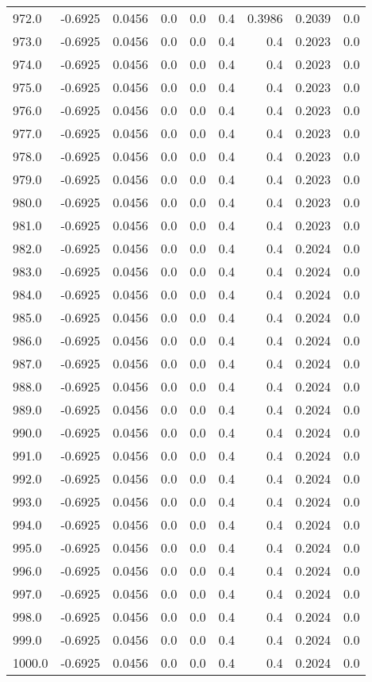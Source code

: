 \begin{longtable}{lrrrrrrrr}
972.0 & -0.6925 & 0.0456 & 0.0 & 0.0 & 0.4 & 0.3986 & 0.2039 & 0.0 \\
973.0 & -0.6925 & 0.0456 & 0.0 & 0.0 & 0.4 & 0.4 & 0.2023 & 0.0 \\
974.0 & -0.6925 & 0.0456 & 0.0 & 0.0 & 0.4 & 0.4 & 0.2023 & 0.0 \\
975.0 & -0.6925 & 0.0456 & 0.0 & 0.0 & 0.4 & 0.4 & 0.2023 & 0.0 \\
976.0 & -0.6925 & 0.0456 & 0.0 & 0.0 & 0.4 & 0.4 & 0.2023 & 0.0 \\
977.0 & -0.6925 & 0.0456 & 0.0 & 0.0 & 0.4 & 0.4 & 0.2023 & 0.0 \\
978.0 & -0.6925 & 0.0456 & 0.0 & 0.0 & 0.4 & 0.4 & 0.2023 & 0.0 \\
979.0 & -0.6925 & 0.0456 & 0.0 & 0.0 & 0.4 & 0.4 & 0.2023 & 0.0 \\
980.0 & -0.6925 & 0.0456 & 0.0 & 0.0 & 0.4 & 0.4 & 0.2023 & 0.0 \\
981.0 & -0.6925 & 0.0456 & 0.0 & 0.0 & 0.4 & 0.4 & 0.2023 & 0.0 \\
982.0 & -0.6925 & 0.0456 & 0.0 & 0.0 & 0.4 & 0.4 & 0.2024 & 0.0 \\
983.0 & -0.6925 & 0.0456 & 0.0 & 0.0 & 0.4 & 0.4 & 0.2024 & 0.0 \\
984.0 & -0.6925 & 0.0456 & 0.0 & 0.0 & 0.4 & 0.4 & 0.2024 & 0.0 \\
985.0 & -0.6925 & 0.0456 & 0.0 & 0.0 & 0.4 & 0.4 & 0.2024 & 0.0 \\
986.0 & -0.6925 & 0.0456 & 0.0 & 0.0 & 0.4 & 0.4 & 0.2024 & 0.0 \\
987.0 & -0.6925 & 0.0456 & 0.0 & 0.0 & 0.4 & 0.4 & 0.2024 & 0.0 \\
988.0 & -0.6925 & 0.0456 & 0.0 & 0.0 & 0.4 & 0.4 & 0.2024 & 0.0 \\
989.0 & -0.6925 & 0.0456 & 0.0 & 0.0 & 0.4 & 0.4 & 0.2024 & 0.0 \\
990.0 & -0.6925 & 0.0456 & 0.0 & 0.0 & 0.4 & 0.4 & 0.2024 & 0.0 \\
991.0 & -0.6925 & 0.0456 & 0.0 & 0.0 & 0.4 & 0.4 & 0.2024 & 0.0 \\
992.0 & -0.6925 & 0.0456 & 0.0 & 0.0 & 0.4 & 0.4 & 0.2024 & 0.0 \\
993.0 & -0.6925 & 0.0456 & 0.0 & 0.0 & 0.4 & 0.4 & 0.2024 & 0.0 \\
994.0 & -0.6925 & 0.0456 & 0.0 & 0.0 & 0.4 & 0.4 & 0.2024 & 0.0 \\
995.0 & -0.6925 & 0.0456 & 0.0 & 0.0 & 0.4 & 0.4 & 0.2024 & 0.0 \\
996.0 & -0.6925 & 0.0456 & 0.0 & 0.0 & 0.4 & 0.4 & 0.2024 & 0.0 \\
997.0 & -0.6925 & 0.0456 & 0.0 & 0.0 & 0.4 & 0.4 & 0.2024 & 0.0 \\
998.0 & -0.6925 & 0.0456 & 0.0 & 0.0 & 0.4 & 0.4 & 0.2024 & 0.0 \\
999.0 & -0.6925 & 0.0456 & 0.0 & 0.0 & 0.4 & 0.4 & 0.2024 & 0.0 \\
1000.0 & -0.6925 & 0.0456 & 0.0 & 0.0 & 0.4 & 0.4 & 0.2024 & 0.0 \\
\end{longtable}
